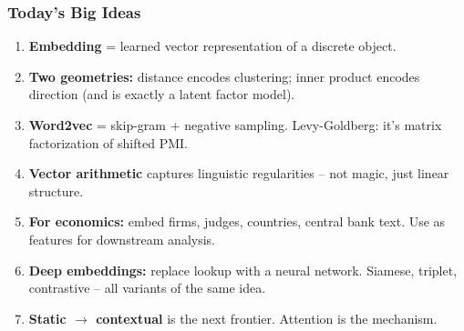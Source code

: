 \documentclass[notes,11pt, aspectratio=169]{beamer}
\begin{document}
\begin{frame}
\frametitle{Today's Big Ideas}

\begin{enumerate}
    \item \textbf{Embedding} = learned vector representation of a discrete object.

    \vspace{4pt}
    \item \textbf{Two geometries:} distance encodes clustering; inner product encodes direction (and is exactly a latent factor model).

    \vspace{4pt}
    \item \textbf{Word2vec} = skip-gram + negative sampling. Levy-Goldberg: it's matrix factorization of shifted PMI.

    \vspace{4pt}
    \item \textbf{Vector arithmetic} captures linguistic regularities -- not magic, just linear structure.

    \vspace{4pt}
    \item \textbf{For economics:} embed firms, judges, countries, central bank text. Use as features for downstream analysis.

    \vspace{4pt}
    \item \textbf{Deep embeddings:} replace lookup with a neural network. Siamese, triplet, contrastive -- all variants of the same idea.

    \vspace{4pt}
    \item \textbf{Static $\to$ contextual} is the next frontier. Attention is the mechanism.
\end{enumerate}
\end{frame}
\end{document}

